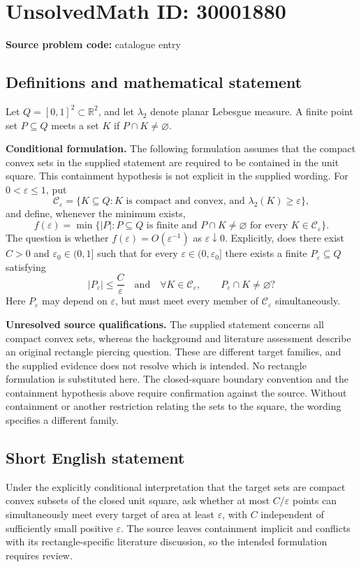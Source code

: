 \documentclass[11pt]{article}
\newcommand{\R}{\mathbb{R}}
\begin{document}
\section*{UnsolvedMath ID: 30001880}
\textbf{Source problem code:} catalogue entry
\subsection{Definitions and mathematical statement}
Let \(Q=[0,1]^2\subset\R^2\), and let \(\lambda_2\) denote planar Lebesgue measure. A finite point set \(P\subseteq Q\) meets a set \(K\) if \(P\cap K\ne\varnothing\).

\textbf{Conditional formulation.} The following formulation assumes that the compact convex sets in the supplied statement are required to be contained in the unit square. This containment hypothesis is not explicit in the supplied wording. For \(0<\varepsilon\le1\), put
\[
\mathcal C_\varepsilon=\{K\subseteq Q:K\text{ is compact and convex, and }\lambda_2(K)\ge\varepsilon\},
\]
and define, whenever the minimum exists,
\[
f(\varepsilon)=\min\bigl\{|P|:P\subseteq Q\text{ is finite and }P\cap K\ne\varnothing\text{ for every }K\in\mathcal C_\varepsilon\bigr\}.
\]
The question is whether \(f(\varepsilon)=O(\varepsilon^{-1})\) as \(\varepsilon\downarrow0\). Explicitly, does there exist \(C>0\) and \(\varepsilon_0\in(0,1]\) such that for every \(\varepsilon\in(0,\varepsilon_0]\) there exists a finite \(P_\varepsilon\subseteq Q\) satisfying
\[
|P_\varepsilon|\le\frac{C}{\varepsilon}
\quad\text{and}\quad
\forall K\in\mathcal C_\varepsilon,\qquad P_\varepsilon\cap K\ne\varnothing?
\]
Here \(P_\varepsilon\) may depend on \(\varepsilon\), but must meet every member of \(\mathcal C_\varepsilon\) simultaneously.

\textbf{Unresolved source qualifications.} The supplied statement concerns all compact convex sets, whereas the background and literature assessment describe an original rectangle piercing question. These are different target families, and the supplied evidence does not resolve which is intended. No rectangle formulation is substituted here. The closed-square boundary convention and the containment hypothesis above require confirmation against the source. Without containment or another restriction relating the sets to the square, the wording specifies a different family.
\subsection{Short English statement}
Under the explicitly conditional interpretation that the target sets are compact convex subsets of the closed unit square, ask whether at most \(C/\varepsilon\) points can simultaneously meet every target of area at least \(\varepsilon\), with \(C\) independent of sufficiently small positive \(\varepsilon\). The source leaves containment implicit and conflicts with its rectangle-specific literature discussion, so the intended formulation requires review.
\end{document}
